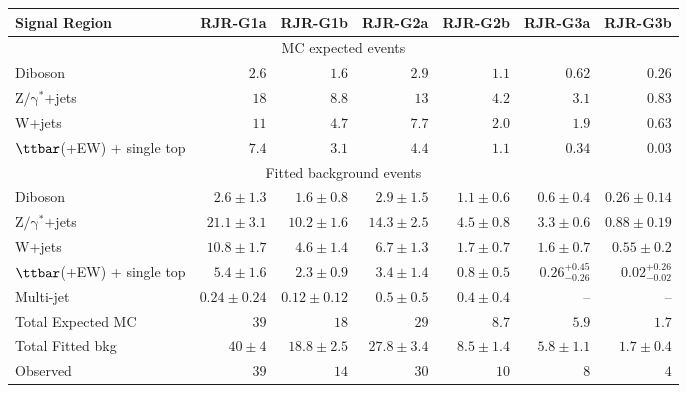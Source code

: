 \begin{table}[tbp]
\begin{center}
\begin{tabular}{|lrrrrrr|}
\hline
Signal Region & \textbf{ RJR-G1a } & \textbf{ RJR-G1b } & \textbf{ RJR-G2a } & \textbf{ RJR-G2b } & \textbf{ RJR-G3a } & \textbf{ RJR-G3b } \\
\hline
\multicolumn{7}{|c|}{MC expected events} \\ \hline
Diboson &  $2.6$               &  $1.6$               &  $2.9$               &  $1.1$               &  $0.62$               &  $0.26$               \\
$\mathrm{Z/\gamma^{*}}$+jets &  $18$               &  $8.8$               &  $13$               &  $4.2$               &  $3.1$               &  $0.83$               \\
W+jets &  $11$               &  $4.7$               &  $7.7$               &  $2.0$               &  $1.9$               &  $0.63$               \\
$\ttbar$(+EW) + single top &  $7.4$               &  $3.1$               &  $4.4$               &  $1.1$               &  $0.34$               &  $0.03$               \\
\hline
\multicolumn{7}{|c|}{Fitted background events} \\ \hline
Diboson & $2.6 \pm 1.3$ & $1.6 \pm 0.8$ & $2.9 \pm 1.5$ & $1.1 \pm 0.6$ & $0.6 \pm 0.4$ & $0.26 \pm 0.14$ \\
$\mathrm{Z/\gamma^{*}}$+jets & $21.1 \pm 3.1$ & $10.2 \pm 1.6$ & $14.3 \pm 2.5$ & $4.5 \pm 0.8$ & $3.3 \pm 0.6$ & $0.88 \pm 0.19$ \\
W+jets & $10.8 \pm 1.7$ & $4.6 \pm 1.4$ & $6.7 \pm 1.3$ & $1.7 \pm 0.7$ & $1.6 \pm 0.7$ & $0.55 \pm 0.2$ \\
$\ttbar$(+EW) + single top & $5.4 \pm 1.6$ & $2.3 \pm 0.9$ & $3.4 \pm 1.4$ & $0.8 \pm 0.5$ &  $0.26_{-0.26}^{+0.45}$               &  $0.02_{-0.02}^{+0.26}$               \\
Multi-jet & $0.24 \pm 0.24$ & $0.12 \pm 0.12$ & $0.5 \pm 0.5$ & $0.4 \pm 0.4$ & -- & -- \\
\hline
Total Expected MC &  $39$               &  $18$               &  $29$               &  $8.7$               &  $5.9$               &  $1.7$               \\
\hline
Total Fitted bkg & $40 \pm 4$ & $18.8 \pm 2.5$ & $27.8 \pm 3.4$ & $8.5 \pm 1.4$ & $5.8 \pm 1.1$ & $1.7 \pm 0.4$ \\
\hline
Observed &  $39$                     &  $14$                     &  $30$                     &  $10$                     &  $8$                     &  $4$                     \\
\hline



\end{tabular}
\end{center}
\end{table}
